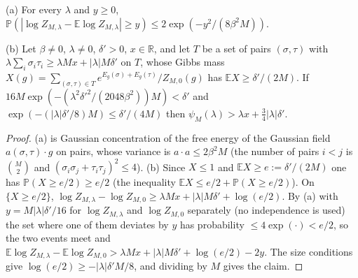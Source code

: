 \begin{theorem}
\label{thm:sg-tal:coupled-core}
  \leanok
{}
(a) For every $\lambda$ and $y\ge0$, $\mathbb P(|\log Z_{M,\lambda}-\mathbb E\log Z_{M,\lambda}|\ge y)\le 2\exp(-y^2/(8\beta^2M))$.

(b) Let $\beta\ne0$, $\lambda\ne0$, $\delta'>0$, $x\in\mathbb R$, and let $T$ be a set of pairs $(\sigma,\tau)$ with
$\lambda\sum_i\sigma_i\tau_i\ge\lambda Mx+|\lambda|M\delta'$ on $T$, whose Gibbs mass $X(g)=\sum_{(\sigma,\tau)\in T}e^{E_g(\sigma)+E_g(\tau)}/Z_{M,0}(g)$
has $\mathbb E X\ge\delta'/(2M)$.  If $16M\exp(-(\lambda^2\delta'^2/(2048\beta^2))M)<\delta'$ and $\exp(-(|\lambda|\delta'/8)M)\le\delta'/(4M)$ then
$\psi_M(\lambda)>\lambda x+\tfrac34|\lambda|\delta'$.
\end{theorem}
\begin{proof}
  \leanok
(a) is Gaussian concentration of the free energy of the Gaussian field $a(\sigma,\tau)\cdot g$ on pairs, whose variance is
$a\cdot a\le2\beta^2M$ (the number of pairs $i<j$ is $\binom M2$ and $(\sigma_i\sigma_j+\tau_i\tau_j)^2\le4$).
(b) Since $X\le1$ and $\mathbb EX\ge e:=\delta'/(2M)$ one has $\mathbb P(X\ge e/2)\ge e/2$ (the inequality $\mathbb EX\le e/2+\mathbb P(X\ge e/2)$).
On $\{X\ge e/2\}$, $\log Z_{M,\lambda}-\log Z_{M,0}\ge\lambda Mx+|\lambda|M\delta'+\log(e/2)$.  By (a) with $y=M|\lambda|\delta'/16$ for $\log Z_{M,\lambda}$
and $\log Z_{M,0}$ separately (no independence is used) the set where one of them deviates by $y$ has probability $\le4\exp(\cdot)<e/2$, so
the two events meet and $\mathbb E\log Z_{M,\lambda}-\mathbb E\log Z_{M,0}>\lambda Mx+|\lambda|M\delta'+\log(e/2)-2y$.  The size conditions give
$\log(e/2)\ge-|\lambda|\delta'M/8$, and dividing by $M$ gives the claim.
\end{proof}

